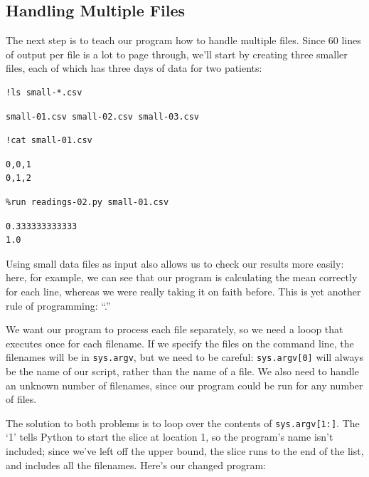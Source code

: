\documentclass{book}
\begin{document}
\subsection{Handling Multiple Files}

The next step is to teach our program how to handle multiple files.
Since 60 lines of output per file is a lot to page through, we'll start
by creating three smaller files, each of which has three days of data
for two patients:

\begin{verbatim}
!ls small-*.csv
\end{verbatim}

\begin{verbatim}
small-01.csv small-02.csv small-03.csv
\end{verbatim}

\begin{verbatim}
!cat small-01.csv
\end{verbatim}

\begin{verbatim}
0,0,1
0,1,2
\end{verbatim}

\begin{verbatim}
%run readings-02.py small-01.csv
\end{verbatim}

\begin{verbatim}
0.333333333333
1.0
\end{verbatim}

Using small data files as input also allows us to check our results more
easily: here, for example, we can see that our program is calculating
the mean correctly for each line, whereas we were really taking it on
faith before. This is yet another rule of programming:
``.''

We want our program to process each file separately, so we need a looop
that executes once for each filename. If we specify the files on the
command line, the filenames will be in \texttt{sys.argv}, but we need to
be careful: \texttt{sys.argv{[}0{]}} will always be the name of our
script, rather than the name of a file. We also need to handle an
unknown number of filenames, since our program could be run for any
number of files.

The solution to both problems is to loop over the contents of
\texttt{sys.argv{[}1:{]}}. The `1' tells Python to start the slice at
location 1, so the program's name isn't included; since we've left off
the upper bound, the slice runs to the end of the list, and includes all
the filenames. Here's our changed program:
\end{document}
